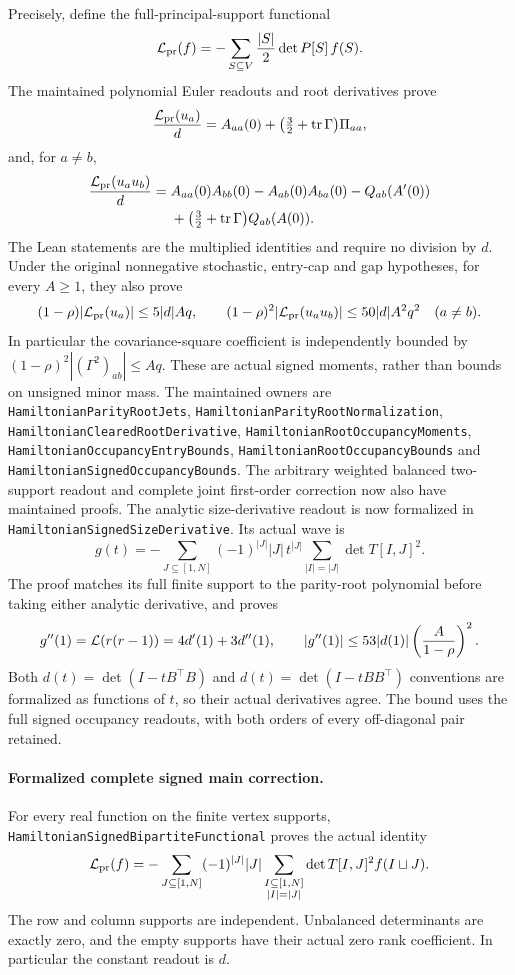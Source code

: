 Precisely, define the full-principal-support functional
\[
 {\cal L}_{\rm pr}(f)=
   -\sum_{S\subseteq V}\frac{|S|}{2}\det P[S]\,f(S).
\]
The maintained polynomial Euler readouts and root derivatives prove
\[
 \frac{{\cal L}_{\rm pr}(u_a)}d
 =A_{aa}(0)+\bigl(\tfrac32+\operatorname{tr}\Gamma\bigr)\Pi_{aa},
\]
and, for \(a\ne b\),
\[
 \begin{split}
 \frac{{\cal L}_{\rm pr}(u_au_b)}d
 ={}&A_{aa}(0)A_{bb}(0)-A_{ab}(0)A_{ba}(0)
       -Q_{ab}(A'(0))\\
 &+\bigl(\tfrac32+\operatorname{tr}\Gamma\bigr)Q_{ab}(A(0)).
 \end{split}
\]
The Lean statements are the multiplied identities and require no
division by \(d\). Under the original nonnegative stochastic,
entry-cap and gap hypotheses, for every \(A\geq1\), they also prove
\[
 (1-\rho)|{\cal L}_{\rm pr}(u_a)|\leq5|d|Aq,\qquad
 (1-\rho)^2|{\cal L}_{\rm pr}(u_au_b)|
                         \leq50|d|A^2q^2\quad(a\ne b).
\]
In particular the covariance-square coefficient is independently
bounded by
\((1-\rho)^2|(\Gamma^2)_{ab}|\leq Aq\).
These are actual signed moments, rather than bounds on unsigned
minor mass. The maintained owners are
\texttt{HamiltonianParityRootJets},
\texttt{HamiltonianParityRootNormalization},
\texttt{HamiltonianClearedRootDerivative},
\texttt{HamiltonianRootOccupancyMoments},
\texttt{HamiltonianOccupancyEntryBounds},
\texttt{HamiltonianRootOccupancyBounds} and
\texttt{HamiltonianSignedOccupancyBounds}.
The arbitrary weighted balanced two-support readout and complete
joint first-order correction now also have maintained proofs.
The analytic size-derivative readout is now formalized in
\texttt{HamiltonianSignedSizeDerivative}. Its actual wave is
\[
 g(t)=-\sum_{J\subseteq[1,N]}(-1)^{|J|}|J|\,t^{|J|}
                   \sum_{|I|=|J|}\det T[I,J]^2.
\]
The proof matches its full finite support to the parity-root
polynomial before taking either analytic derivative, and proves
\[
 g''(1)={\cal L}(r(r-1))=4d'(1)+3d''(1),\qquad
 |g''(1)|\leq53|d(1)|\left(\frac A{1-\rho}\right)^2 .
\]
Both \(d(t)=\det(I-tB^\top B)\) and
\(d(t)=\det(I-tBB^\top)\) conventions are formalized as functions
of \(t\), so their actual derivatives agree.
The bound uses the full signed occupancy readouts, with both
orders of every off-diagonal pair retained.

\paragraph{Formalized complete signed main correction.}
For every real function on the finite vertex supports,
\texttt{HamiltonianSignedBipartiteFunctional} proves the actual identity
\[
 {\cal L}_{\rm pr}(f)=
 -\sum_{J\subseteq[1,N]}(-1)^{|J|}|J|
     \sum_{\substack{I\subseteq[1,N]\\|I|=|J|}}
          \det T[I,J]^2 f(I\sqcup J).
\]
The row and column supports are independent. Unbalanced determinants
are exactly zero, and the empty supports have their actual zero
rank coefficient. In particular the constant readout is \(d\).

